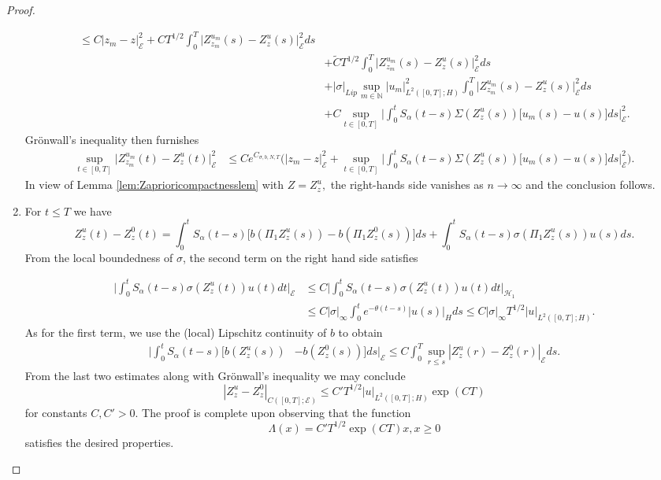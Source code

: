 \documentclass[10pt, reqno]{amsart}
\newcommand{\N}{\mathbb{N}}
\newcommand{\h}{\mathcal{H}}
\newcommand{\e}{\mathcal{E}}
\theoremstyle{definition}
\numberwithin{lem}{section}
\numberwithin{cor}{section}
\numberwithin{prop}{section}
\numberwithin{thm}{section}
\numberwithin{dfn}{section}
\begin{document}
\begin{proof}
\begin{enumerate}
\begin{equation*}
\begin{aligned}
\leq C| z_m-z|^2_{\e}+CT^{1/2}\int_{0}^{T}\big|Z^{u_m}_{z_m}(s)-Z^{u}_{z}(s)|^2_{\e}ds\\&+\tilde{C}T^{1/2}\int_{0}^{T} |Z^{u_m}_{z_m}(s)-Z^{u}_{z}(s)\big|^2_{\e}ds\\&
+|\sigma|_{Lip}\sup_{m\in\N}|u_m|^2_{L^2([0,T];H)}\int_{0}^{T}\big|Z^{u_m}_{z_m}(s)-Z^{u}_{z}(s)|^2_{\e}ds\\&
+C\sup_{t\in[0,T]}\bigg|\int_{0}^{t}S_\alpha(t-s) \Sigma(Z^{u}_{z}(s))\big[u_m(s)-u(s)\big]ds\bigg|^2_{\e}.
\end{aligned}
\end{equation*}
Gr\"onwall's inequality then furnishes
\begin{equation*}
\begin{aligned}
\sup_{t\in[0,T]}|Z^{u_m}_{z_m}(t)-Z^{u}_{z}(t)\big|^2_{\e}&
\leq Ce^{C_{\sigma, b, N, T}}\bigg(| z_m-z|^2_{\e}+\sup_{t\in[0,T]}\bigg|\int_{0}^{t}S_\alpha(t-s) \Sigma(Z^{u}_{z}(s))\big[u_m(s)-u(s)\big]ds\bigg|^2_{\e}\bigg).
\end{aligned}
\end{equation*}
In view of Lemma \ref{lem:Zaprioricompactnesslem} with $Z=Z^{u}_{z},$ the right-hands side vanishes as $n\to\infty$ and the conclusion follows.
\item 
For $t\leq T$ we have 
\begin{equation*}
   Z_z^u(t)-Z_z^0(t)=\int_{0}^tS_\alpha(t-s)\big[b(  \Pi_1Z_z^u(s))- b(\Pi_1  Z_z^0(s))\big]ds+\int_{0}^tS_\alpha(t-s)\sigma( \Pi_1 Z_z^u(s))u(s)ds.
\end{equation*}
From the local boundedness of $\sigma$, the second term on the right hand side satisfies 

\begin{equation*}
    \begin{aligned}
        \bigg|\int_{0}^tS_\alpha(t-s)\sigma(  Z_z^u(t))u(t)dt\bigg|_{\e}&\leq C \bigg|\int_{0}^tS_\alpha(t-s)\sigma( Z_z^u(t))u(t)dt\bigg|_{\h_1}\\&\leq C|\sigma|_{\infty}\int_{0}^{t}e^{-\theta(t-s)} |u(s)|_{H}ds\leq C|\sigma|_{\infty} T^{1/2}|u|_{L^2([0,T];H)}.
    \end{aligned}
\end{equation*}
As for the first term, we use the (local) Lipschitz continuity of $b$ to obtain
\begin{equation*}
\begin{aligned}
    \bigg|\int_{0}^{t}S_\alpha(t-s)\big[b(  Z_z^u(s))&- b(  Z_z^0(s))\big]ds\bigg|_{\e}\leq C\int_{0}^{T}\sup_{r\leq s}|Z^{u}_{z}(r)-Z^{0}_{z}(r)|_{\e} ds.
\end{aligned}  
\end{equation*}
From the last two estimates along with Gr\"onwall's inequality we may conclude
\begin{equation*}
 | Z_z^u-Z_z^0|_{C([0,T];\e)}\leq C'T^{1/2}|u|_{L^2([0,T];H)}\exp(CT)
\end{equation*}
for constants $C, C'>0.$  The proof is complete upon observing that the function $$\Lambda(x)=C'T^{1/2}\exp(CT)x, x\geq 0$$ satisfies the desired properties.\end{enumerate}\end{proof}
\end{document}
